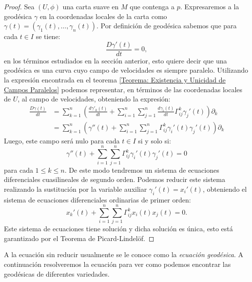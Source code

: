 \begin{proof}
  Sea $(U,\phi)$ una carta suave en $M$ que contenga a $p$. Expresaremos a la geodésica $\gamma$ en la coordenadas locales de la carta como $\gamma(t) = (\gamma_{1}(t), \ldots, \gamma_{n}(t))$. Por definición de geodésica sabemos que para cada $t \in I$ se tiene:
  \[
    \frac{D \gamma'(t)}{dt} = 0,
  \]
  en los términos estudiados en la sección anterior, esto quiere decir que una geodésica es una curva cuyo campo de velocidades es siempre paralelo. Utilizando la expresión encontrada en el teorema \ref{Teorema: Existencia y Unicidad de Campos Paralelos} podemos representar, en términos de las coordenadas locales de $U$, al campo de velocidades, obteniendo la expresión:
  \begin{align*}
    \frac{D\gamma(t)}{dt} &= \sum_{k=1}^{n} \left( 
    \frac{d\gamma'_k(t)}{dt} + \sum_{i=1}^{n}\sum_{j=1}^{n} \frac{d\gamma_{i}(t)}{dt} \Gamma_{ij}^{k}\gamma_{j}'(t)
    \right) \partial_{k} \\
    &= \sum_{k=1}^{n} \left( \gamma''(t) + \sum_{i=1}^{n}\sum_{j=1}^{n} \Gamma_{ij}^{k} \gamma_{i}'(t)\gamma_{j}'(t) 
    \right)\partial_{k}
  \end{align*}
  Luego, este campo será nulo para cada $t \in I$ si y solo si:
  \[
    \gamma''(t) + \sum_{i=1}^{n}\sum_{j=1}^{n} \Gamma_{ij}^{k}\gamma_{i}'(t) \gamma_{j}'(t) = 0
  \]
  para cada $1 \leq k \leq n$. De este modo tendremos un sistema de ecuaciones diferenciales cuasilineales de segundo orden. Podemos reducir este sistema realizando la sustitución por la variable auxiliar $\gamma_{i}'(t) = x_{i}'(t)$, obteniendo el sistema de ecuaciones diferenciales ordinarias de primer orden:
  \[
    x_{k}'(t) + \sum_{i=1}^{n} \sum_{j=1}^{n} \Gamma_{ij}^{k} x_{i}(t) x_{j}(t) = 0.
  \]
  Este sistema de ecuaciones tiene solución y dicha solución es única, esto está garantizado por el Teorema de Picard-Lindelöf.
\end{proof}

A la ecuación sin reducir usualmente se le conoce como la \textit{ecuación geodésica}. A continuación resolveremos la ecuación para ver como podemos encontrar las geodésicas de diferentes variedades.
